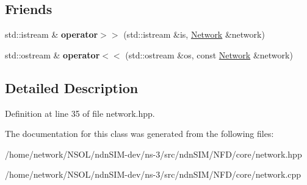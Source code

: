 \subsection*{Friends}
\begin{DoxyCompactItemize}
\item 
std\+::istream \& {\bfseries operator$>$$>$} (std\+::istream \&is, \hyperlink{classnfd_1_1Network}{Network} \&network)\hypertarget{classnfd_1_1Network_a2dcf76091390c29b8127be88a166ef6b}{}\label{classnfd_1_1Network_a2dcf76091390c29b8127be88a166ef6b}

\item 
std\+::ostream \& {\bfseries operator$<$$<$} (std\+::ostream \&os, const \hyperlink{classnfd_1_1Network}{Network} \&network)\hypertarget{classnfd_1_1Network_afa114a9280b4ec6b7830d1093954be82}{}\label{classnfd_1_1Network_afa114a9280b4ec6b7830d1093954be82}

\end{DoxyCompactItemize}


\subsection{Detailed Description}


Definition at line 35 of file network.\+hpp.



The documentation for this class was generated from the following files\+:\begin{DoxyCompactItemize}
\item 
/home/network/\+N\+S\+O\+L/ndn\+S\+I\+M-\/dev/ns-\/3/src/ndn\+S\+I\+M/\+N\+F\+D/core/network.\+hpp\item 
/home/network/\+N\+S\+O\+L/ndn\+S\+I\+M-\/dev/ns-\/3/src/ndn\+S\+I\+M/\+N\+F\+D/core/network.\+cpp\end{DoxyCompactItemize}
